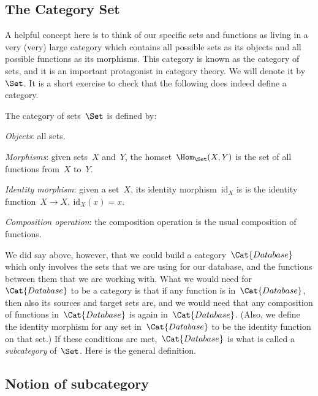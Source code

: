 \subsection{The Category Set}

A helpful concept here is to think of our specific sets and functions as living in a very (very) large category which contains all possible sets as its objects and all possible functions as its morphisms. This category is known as the category of sets, and it is an important protagonist in category theory. We will denote it by $\Set$. It is a short exercise to check that the following does indeed define a category.

\begin{ctdefinition}
The category of sets~$\Set$ is defined by:
    \begin{compactenum}
    \item \emph{Objects}: all sets.
    \item \emph{Morphisms}: given sets~$X$ and~$Y$, the homset~$\Hom_\Set(X,Y)$ is the set of all functions from~$X$ to~$Y$.
    \item \emph{Identity morphism}: given a set~$X$, its identity morphism~$\text{id}_X$ is
    is the identity function~$X \to X, \ \text{id}_X(x) = x$.
    \item \emph{Composition operation}: the composition operation is the usual composition of functions.
    \end{compactenum}
\end{ctdefinition} 



We did say above, however, that we could build a category~$\Cat{Database}$ which only involves the sets that we are using for our database, and the functions between them that we are working with. What we would need for~$\Cat{Database}$ to be a category is that if any function is in~$\Cat{Database}$, then also its sources and target sets are, and we would need that any composition of functions in~$\Cat{Database}$ is again in~$\Cat{Database}$. (Also, we define the identity morphism for any set in~$\Cat{Database}$ to be the identity function on that set.) If these conditions are met,~$\Cat{Database}$ is what is called a \emph{subcategory} of~$\Set$. Here is the general definition. 


\subsection{Notion of subcategory}
 
